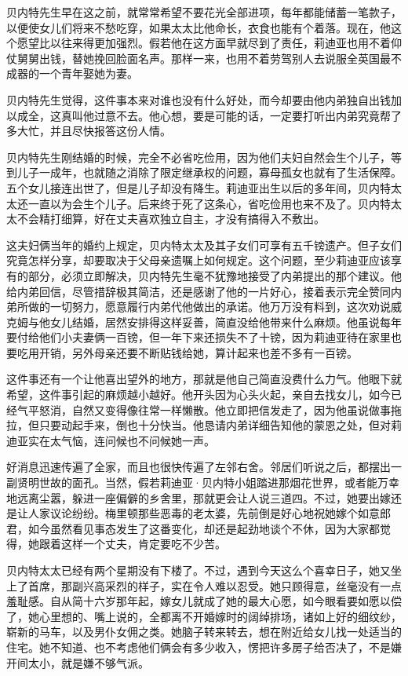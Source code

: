 \par 贝内特先生早在这之前，就常常希望不要花光全部进项，每年都能储蓄一笔款子，以便使女儿们将来不愁吃穿，如果太太比他命长，衣食也能有个着落。现在，他这个愿望比以往来得更加强烈。假若他在这方面早就尽到了责任，莉迪亚也用不着仰仗舅舅出钱，替她挽回脸面名声。那样一来，也用不着劳驾别人去说服全英国最不成器的一个青年娶她为妻。
\par 贝内特先生觉得，这件事本来对谁也没有什么好处，而今却要由他内弟独自出钱加以成全，这真叫他过意不去。他心想，要是可能的话，一定要打听出内弟究竟帮了多大忙，并且尽快报答这份人情。
\par 贝内特先生刚结婚的时候，完全不必省吃俭用，因为他们夫妇自然会生个儿子，等到儿子一成年，也就随之消除了限定继承权的问题，寡母孤女也就有了生活保障。五个女儿接连出世了，但是儿子却没有降生。莉迪亚出生以后的多年间，贝内特太太还一直以为会生个儿子。后来终于死了这条心，省吃俭用也来不及了。贝内特太太不会精打细算，好在丈夫喜欢独立自主，才没有搞得入不敷出。
\par 这夫妇俩当年的婚约上规定，贝内特太太及其子女们可享有五千镑遗产。但子女们究竟怎样分享，却要取决于父母亲遗嘱上如何规定。这个问题，至少莉迪亚应该享有的部分，必须立即解决，贝内特先生毫不犹豫地接受了内弟提出的那个建议。他给内弟回信，尽管措辞极其简洁，还是感谢了他的一片好心，接着表示完全赞同内弟所做的一切努力，愿意履行内弟代他做出的承诺。他万万没有料到，这次劝说威克姆与他女儿结婚，居然安排得这样妥善，简直没给他带来什么麻烦。他虽说每年要付给他们小夫妻俩一百镑，但一年下来还损失不了十镑，因为莉迪亚待在家里也要吃用开销，另外母亲还要不断贴钱给她，算计起来也差不多有一百镑。
\par 这件事还有一个让他喜出望外的地方，那就是他自己简直没费什么力气。他眼下就希望，这件事引起的麻烦越小越好。他开头因为心头火起，亲自去找女儿，如今已经气平怒消，自然又变得像往常一样懒散。他立即把信发走了，因为他虽说做事拖拉，但只要动起手来，倒也十分快当。他恳请内弟详细告知他的蒙恩之处，但对莉迪亚实在太气恼，连问候也不问候她一声。
\par 好消息迅速传遍了全家，而且也很快传遍了左邻右舍。邻居们听说之后，都摆出一副贤明世故的面孔。当然，假若莉迪亚·贝内特小姐踏进那烟花世界，或者能万幸地远离尘嚣，躲进一座偏僻的乡舍里，那就更会让人说三道四。不过，她要出嫁还是让人家议论纷纷。梅里顿那些恶毒的老太婆，先前倒是好心地祝她嫁个如意郎君，如今虽然看见事态发生了这番变化，却还是起劲地谈个不休，因为大家都觉得，她跟着这样一个丈夫，肯定要吃不少苦。
\par 贝内特太太已经有两个星期没有下楼了。不过，遇到今天这么个喜幸日子，她又坐上了首席，那副兴高采烈的样子，实在令人难以忍受。她只顾得意，丝毫没有一点羞耻感。自从简十六岁那年起，嫁女儿就成了她的最大心愿，如今眼看要如愿以偿了，她心里想的、嘴上说的，全都离不开婚嫁时的阔绰排场，诸如上好的细纹纱，崭新的马车，以及男仆女佣之类。她脑子转来转去，想在附近给女儿找一处适当的住宅。她不知道、也不考虑他们俩会有多少收入，愣把许多房子给否决了，不是嫌开间太小，就是嫌不够气派。
